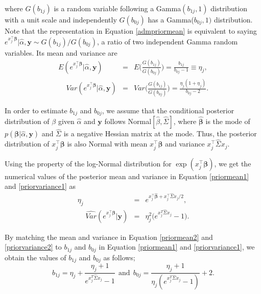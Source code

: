 \documentclass[article]{jss}
\begin{document}
where $G(b_{1j})$ is a random variable following a Gamma$(b_{1j}, 1)$ distribution with a unit scale and independently $G(b_{0j})$ has a Gamma($b_{0j}, 1)$ distribution.  Note that the representation in Equation \ref{admpriormean} is equivalent to saying $e^{x_j^\top\boldsymbol{\beta}}\vert\hat{\alpha}, \boldsymbol{y}\sim G(b_{1j})/G(b_{0j})$, a ratio of two independent Gamma random variables. Its mean and variance are
\begin{eqnarray}
E(e^{x_j^\top\boldsymbol{\beta}}\vert\hat{\alpha}, \boldsymbol{y})&=&E\bigg(\frac{G(b_{1j})}{G(b_{0j})}\bigg)=\frac{b_{1j}}{b_{0j}-1}\equiv\eta_j,\label{priormean1}\\
~~~~~Var(e^{x_j^\top\boldsymbol{\beta}}\vert\hat{\alpha}, \boldsymbol{y})&=&Var\bigg(\frac{G(b_{1j})}{G(b_{0j})}\bigg)=\frac{\eta_j(1+\eta_j)}{b_{0j}-2}.\label{priorvariance1}
\end{eqnarray}

In order to estimate $b_{1j}$ and $b_{0j}$, we assume that the conditional posterior distribution of $\beta$ given $\hat{\alpha}$ and $\boldsymbol{y}$ follows Normal$[\hat{\beta}, \hat{\Sigma}]$, where $\hat{\boldsymbol{\beta}}$ is the mode of $p(\boldsymbol{\beta}\vert \hat{\alpha}, \boldsymbol{y})$  and $\hat{\Sigma}$ is a negative Hessian matrix at the mode. Thus, the posterior distribution of $x_j^\top\boldsymbol{\beta}$ is also Normal with mean $x_j^\top\hat{\boldsymbol{\beta}}$ and variance $x_j^\top\hat{\Sigma} x_j$.

Using the property of the log-Normal distribution for $\exp(x_j^\top\boldsymbol{\beta})$, we get the numerical values of the posterior mean and variance in Equation \ref{priormean1} and \ref{priorvariance1} as
\begin{eqnarray}
\eta_j&=&e^{x_j^\top\hat{\boldsymbol{\beta}}+x_j^\top\hat{\Sigma} x_j/2},\label{priormean2}\\
~~~~~\widehat{Var}(e^{x_j^\top\boldsymbol{\beta}}\vert\boldsymbol{y})&=&\eta^2_j\big(e^{x_j^{T}\hat{\Sigma} x_j}-1\big).\label{priorvariance2}
\end{eqnarray}

By matching the  mean and variance in Equation \ref{priormean2} and \ref{priorvariance2} to $b_{1j}$ and $b_{0j}$ in Equation \ref{priormean1} and \ref{priorvariance1}, we obtain the values of $b_{1j}$ and $b_{0j}$ as follows;
\begin{equation}\label{priormeanpara}
b_{1j}=\eta_j+\frac{\eta_j + 1}{e^{x_j^{T}\hat{\Sigma} x_j}-1}~~\textrm{and}~~b_{0j}=\frac{\eta_j + 1}{\eta_j(e^{x_j^{T}\hat{\Sigma} x_j}-1)}+2.
\end{equation}
\end{document}
